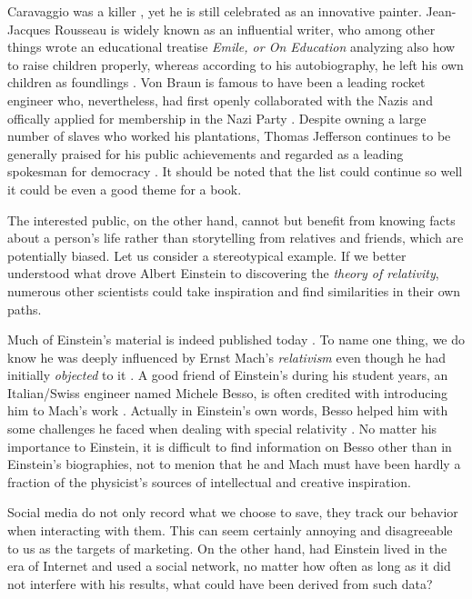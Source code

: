 Caravaggio was a killer \cite{caravaggio}, yet he is still celebrated as an innovative painter.
Jean-Jacques Rousseau is widely known as an influential writer, who among other things wrote an educational treatise \textit{Emile, or On Education} analyzing also how to raise children properly, whereas according to his autobiography, he left his own children as foundlings \cite{rousseau}.
Von Braun is famous to have been a leading rocket engineer who, nevertheless, had first openly collaborated with the Nazis and offically applied for membership in the Nazi Party \cite{vonbraun}.
Despite owning a large number of slaves who worked his plantations, Thomas Jefferson continues to be generally praised for his public achievements and regarded as a leading spokesman for democracy \cite{jefferson}. It should be noted that the list could continue so well it could be even a good theme for a book.

The interested public, on the other hand, cannot but benefit from knowing facts about a person's life rather than storytelling from relatives and friends, which are potentially biased. Let us consider a stereotypical example.
If we better understood what drove Albert Einstein to discovering the \textit{theory of relativity}, numerous other scientists could take inspiration and find similarities in their own paths.

Much of Einstein's material is indeed published today \cite{einstein-notes}. To name one thing, we do know he was deeply influenced by Ernst Mach's \textit{relativism} even though he had initially \emph{objected} to it \cite{einstein-inspiration}. A good friend of Einstein's during his student years, an Italian/Swiss engineer named Michele Besso, is often credited with introducing him to Mach's work \cite{einstein-inspiration}. Actually in Einstein's own words, Besso helped him with some challenges he faced when dealing with special relativity \cite{einstein}.
No matter his importance to Einstein, it is difficult to find information on Besso other than in Einstein's biographies, not to menion that he and Mach must have been hardly a fraction of the physicist's sources of intellectual and creative inspiration.

Social media do not only record what we choose to save, they track our behavior when interacting with them. This can seem certainly annoying and disagreeable to us as the targets of marketing.
On the other hand, had Einstein lived in the era of Internet and used a social network, no matter how often as long as it did not interfere with his results, what could have been derived from such data?

